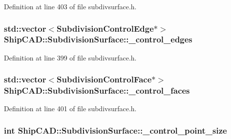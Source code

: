 Definition at line 403 of file subdivsurface.\-h.

\hypertarget{classShipCAD_1_1SubdivisionSurface_ac6b2950f05e07f5a7814b278a9dc1513}{
\subsubsection[{\-\_\-control\-\_\-edges}]{\setlength{\rightskip}{0pt plus 5cm}std\-::vector$<${\bf Subdivision\-Control\-Edge}$\ast$$>$ Ship\-C\-A\-D\-::\-Subdivision\-Surface\-::\-\_\-control\-\_\-edges\hspace{0.3cm}{\ttfamily [protected]}}}\label{classShipCAD_1_1SubdivisionSurface_ac6b2950f05e07f5a7814b278a9dc1513}


Definition at line 399 of file subdivsurface.\-h.

\hypertarget{classShipCAD_1_1SubdivisionSurface_a69c240904f61f8181a57559d4fa548c0}{
\subsubsection[{\-\_\-control\-\_\-faces}]{\setlength{\rightskip}{0pt plus 5cm}std\-::vector$<${\bf Subdivision\-Control\-Face}$\ast$$>$ Ship\-C\-A\-D\-::\-Subdivision\-Surface\-::\-\_\-control\-\_\-faces\hspace{0.3cm}{\ttfamily [protected]}}}\label{classShipCAD_1_1SubdivisionSurface_a69c240904f61f8181a57559d4fa548c0}


Definition at line 401 of file subdivsurface.\-h.

\hypertarget{classShipCAD_1_1SubdivisionSurface_a7ad820b9d312c8ecde939b5345690d35}{
\subsubsection[{\-\_\-control\-\_\-point\-\_\-size}]{\setlength{\rightskip}{0pt plus 5cm}int Ship\-C\-A\-D\-::\-Subdivision\-Surface\-::\-\_\-control\-\_\-point\-\_\-size\hspace{0.3cm}{\ttfamily [protected]}}}\label{classShipCAD_1_1SubdivisionSurface_a7ad820b9d312c8ecde939b5345690d35}


